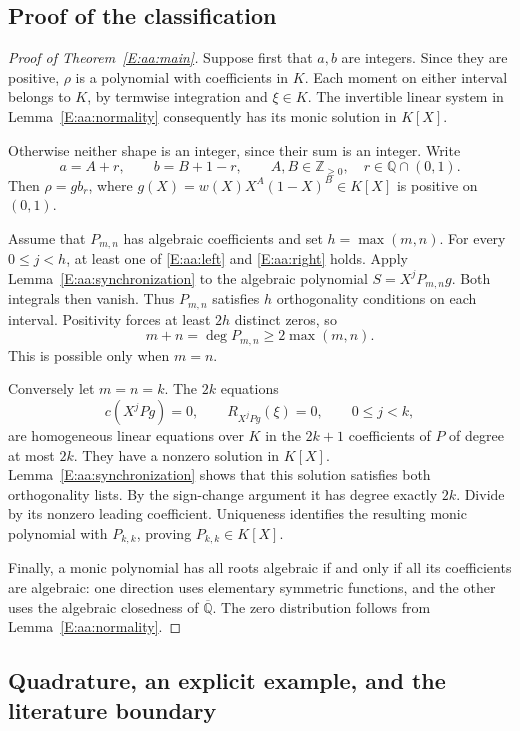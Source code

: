 \documentclass[11pt,a4paper]{article}
\theoremstyle{definition}
\theoremstyle{remark}
\numberwithin{equation}{section}
\begin{document}
\subsection{Proof of the classification}

\begin{proof}[Proof of Theorem~\ref{E:aa:main}]
Suppose first that $a,b$ are integers. Since they are positive,
$\rho$ is a polynomial with coefficients in $K$. Each moment on
either interval belongs to $K$, by termwise integration and
$\xi\in K$. The invertible linear system in
Lemma~\ref{E:aa:normality} consequently has its monic solution in $K[X]$.

Otherwise neither shape is an integer, since their sum is an integer.
Write
\[
 a=A+r,\qquad b=B+1-r,\qquad A,B\in\mathbb Z_{\ge0},
 \quad r\in\mathbb Q\cap(0,1).
\]
Then $\rho=g b_r$, where
$g(X)=w(X)X^A(1-X)^B\in K[X]$ is positive on $(0,1)$.

Assume that $P_{m,n}$ has algebraic coefficients and set
$h=\max(m,n)$. For every $0\le j<h$, at least one of
\eqref{E:aa:left} and \eqref{E:aa:right} holds. Apply
Lemma~\ref{E:aa:synchronization} to the algebraic polynomial
$S=X^jP_{m,n}g$. Both integrals then vanish. Thus $P_{m,n}$
satisfies $h$ orthogonality conditions on each interval. Positivity
forces at least $2h$ distinct zeros, so
\[
 m+n=\deg P_{m,n}\ge 2\max(m,n).
\]
This is possible only when $m=n$.

Conversely let $m=n=k$. The $2k$ equations
\begin{equation}\label{E:aa:balanced-system}
 c(X^jPg)=0,\qquad R_{X^jPg}(\xi)=0,
 \qquad 0\le j<k,
\end{equation}
are homogeneous linear equations over $K$ in the $2k+1$
coefficients of $P$ of degree at most $2k$. They have a nonzero
solution in $K[X]$. Lemma~\ref{E:aa:synchronization} shows that
this solution satisfies both orthogonality lists. By the sign-change
argument it has degree exactly $2k$. Divide by its nonzero leading
coefficient. Uniqueness identifies the resulting monic polynomial
with $P_{k,k}$, proving $P_{k,k}\in K[X]$.

Finally, a monic polynomial has all roots algebraic if and only if
all its coefficients are algebraic: one direction uses elementary
symmetric functions, and the other uses the algebraic closedness of
$\overline{\mathbb Q}$. The zero distribution follows from
Lemma~\ref{E:aa:normality}.
\end{proof}

\subsection{Quadrature, an explicit example, and the literature boundary}
\end{document}
